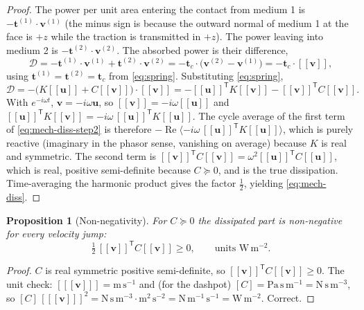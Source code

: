 \documentclass[11pt]{article}
\newcommand{\bu}{\bm{u}}
\newcommand{\bv}{\bm{v}}
\newcommand{\bt}{\bm{t}}
\newcommand{\jmp}[1]{[\![#1]\!]}
\theoremstyle{plain}
\newtheorem{proposition}{Proposition}
\begin{document}
\begin{proof}
The power per unit area entering the contact from medium 1 is
$-\bt^{(1)}\cdot\bv^{(1)}$ (the minus sign is because the outward normal of
medium 1 at the face is $+z$ while the traction is transmitted in $+z$). The power
leaving into medium 2 is $-\bt^{(2)}\cdot\bv^{(2)}$. The absorbed power is their
difference,
\begin{equation}
  \mathcal{D} = -\bt^{(1)}\cdot\bv^{(1)} + \bt^{(2)}\cdot\bv^{(2)}
  = -\bt_c\cdot\big(\bv^{(2)}-\bv^{(1)}\big)
  = -\bt_c\cdot\jmp{\bv},
  \label{eq:mech-diss-step1}
\end{equation}
using $\bt^{(1)}=\bt^{(2)}=\bt_c$ from \eqref{eq:spring}. Substituting
\eqref{eq:spring},
\begin{equation}
  \mathcal{D} = -\big(K\jmp{\bu} + C\jmp{\bv}\big)\cdot\jmp{\bv}
  = -\jmp{\bu}^{\mathsf T}K\jmp{\bv} - \jmp{\bv}^{\mathsf T}C\jmp{\bv}.
  \label{eq:mech-diss-step2}
\end{equation}
With $e^{-i\omega t}$, $\bv = -i\omega\bu$, so $\jmp{\bv} = -i\omega\jmp{\bu}$ and
$\jmp{\bu}^{\mathsf T}K\jmp{\bv}
 = -i\omega\,\jmp{\bu}^{\mathsf T}K\jmp{\bu}$. The cycle average of the first
term of \eqref{eq:mech-diss-step2} is therefore
$-\operatorname{Re}\langle -i\omega\,\jmp{\bu}^{\mathsf T}K\jmp{\bu}\rangle$,
which is purely reactive (imaginary in the phasor sense, vanishing on average)
because $K$ is real and symmetric. The second term is
$\jmp{\bv}^{\mathsf T}C\jmp{\bv} = \omega^2\jmp{\bu}^{\mathsf T}C\jmp{\bu}$,
which is real, positive semi-definite because $C\succeq0$, and is the true
dissipation. Time-averaging the harmonic product gives the factor $\tfrac12$,
yielding \eqref{eq:mech-diss}.
\end{proof}

\begin{proposition}[Non-negativity]
\label{prop:mech-nonneg}
For $C\succeq0$ the dissipated part is non-negative for every velocity jump:
\begin{equation}
  \tfrac12\,\jmp{\bv}^{\mathsf T} C \jmp{\bv} \ge 0,
  \qquad \text{units } \mathrm{W\,m^{-2}} .
  \label{eq:mech-nonneg}
\end{equation}
\end{proposition}
\begin{proof}
$C$ is real symmetric positive semi-definite, so $\jmp{\bv}^{\mathsf T}C\jmp{\bv}\ge0$.
The unit check: $[\jmp{\bv}]=\mathrm{m\,s^{-1}}$ and (for the dashpot)
$[C]=\mathrm{Pa\,s\,m^{-1}}=\mathrm{N\,s\,m^{-3}}$, so
$[C]\,[\jmp{\bv}]^2 = \mathrm{N\,s\,m^{-3}}\cdot\mathrm{m^2\,s^{-2}}
= \mathrm{N\,m^{-1}\,s^{-1}} = \mathrm{W\,m^{-2}}$. Correct.
\end{proof}
\end{document}
